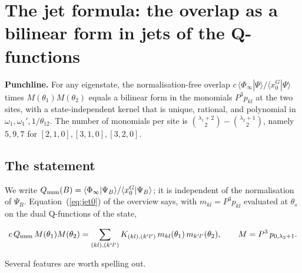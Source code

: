 \documentclass[11pt]{article}
\begin{document}
\section{The jet formula: the overlap as a bilinear form in jets of the Q-functions}\label{sec:jet}

\textbf{Punchline.} For any eigenstate, the normalisation-free overlap $c\,\langle\Phi_\infty|\Psi\rangle/\langle x_0^G|\Psi\rangle$ times $M(\theta_1)M(\theta_2)$ equals a bilinear form in the monomials $P^3p_{kl}$ at the two sites, with a state-independent kernel that is unique, rational, and polynomial in $\omega_1,\omega_1',1/\theta_{12}$. The number of monomials per site is $\binom{\lambda_1+2}{2}-\binom{\lambda_2+1}{2}$, namely $5,9,7$ for $[2,1,0],[3,1,0],[3,2,0]$.

\subsection{The statement}\label{sec:jetstate}

We write $Q_{\rm num}(B)=\langle\Phi_\infty|\Psi_B\rangle/\langle x_0^G|\Psi_B\rangle$; it is independent of the normalisation of $\Psi_B$. Equation~(\ref{eq:jet0}) of the overview says, with $m_{kl}=P^3p_{kl}$ evaluated at $\theta_s$ on the dual Q-functions of the state,

\begin{equation}
c\,Q_{\rm num}\,M(\theta_1)M(\theta_2)=\sum_{(kl),(k'l')}K_{(kl),(k'l')}\,m_{kl}(\theta_1)\,m_{k'l'}(\theta_2),\qquad M=P^3\,p_{0,\lambda_2+1}.\label{eq:jet}
\end{equation}

Several features are worth spelling out.
\end{document}
